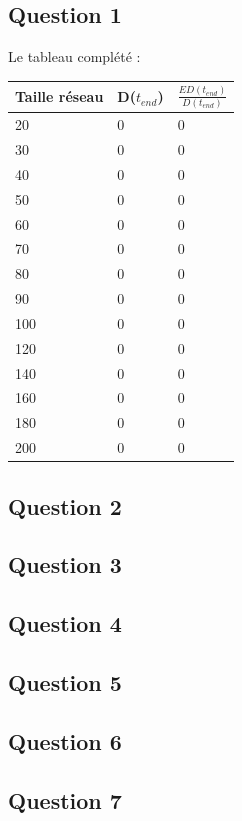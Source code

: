 \documentclass[10pt]{report}
\begin{document}
\subsection{Question 1}
Le tableau complété :\\

\begin{center}
\begin{tabular}{|l|l|l|}
  \hline
  Taille réseau & D($t_{end}$) & $\frac{ED(t_{end})}{D(t_{end})}$\\
  \hline
	20 & 0 & 0\\
  \hline
  	30 & 0 & 0\\
  \hline
  	40 & 0 & 0\\
  \hline
  	50 & 0 & 0\\
  \hline
  	60 & 0 & 0\\
  \hline
  	70 & 0 & 0\\
  \hline
        80 & 0 & 0\\
  \hline
  	90 & 0 & 0\\
  \hline
  	100 & 0 & 0\\
  \hline
  	120 & 0 & 0\\
  \hline
  	140 & 0 & 0\\
  \hline
  	160 & 0 & 0\\
  \hline
  	180 & 0 & 0\\
  \hline
  	200 & 0 & 0\\
  \hline
\end{tabular}
\end{center}

\subsection{Question 2}
\subsection{Question 3}
\subsection{Question 4}
\subsection{Question 5}
\subsection{Question 6}
\subsection{Question 7}
\end{document}
